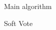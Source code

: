 \documentclass[10pt,a4paper]{article}
\begin{document}
\begin{section}{Main algorithm}
\begin{subsection}{Soft Vote}
\end{subsection}
    
       
    
        

    



\end{section}
\end{document}
